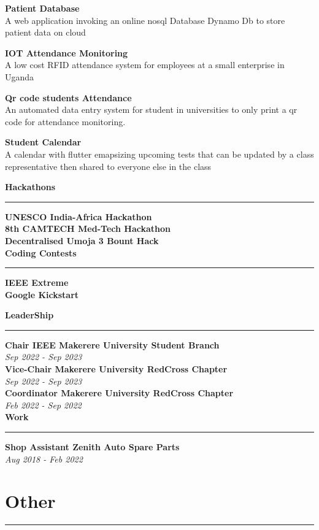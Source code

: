 \documentclass[a4paper]{article}
\begin{document}
\begin{minipage}[t]{0.5\textwidth}
        {\bf Patient Database}\\
        A web application invoking an online nosql Database Dynamo Db to store patient data on cloud

        {\bf IOT Attendance Monitoring}\\
        A low cost RFID attendance system for employees at a small enterprise in Uganda

        {\bf Qr code students Attendance}\\
        An automated data entry system for student in universities to only print a qr code for attendance monitoring.

        {\bf Student Calendar}\\
        A calendar with flutter emapsizing upcoming tests that can be updated by a class representative then shared to everyone else in the class

        {\Large\bf Hackathons}
        \hrule
        {\bf UNESCO India-Africa Hackathon}\\
        {\bf 8th CAMTECH Med-Tech Hackathon}\\
        {\bf Decentralised Umoja 3 Bount Hack}\\
        {\Large\bf Coding Contests}
        \hrule
        {\bf IEEE Extreme}\\
        {\bf Google Kickstart}\\

    \end{minipage}
    \hfil
    \begin{minipage}[t]{0.5\textwidth}
        {\Large\bf LeaderShip}
        \hrule
        {\bf Chair IEEE Makerere University Student Branch}\\
        \hfil{\em Sep 2022 - Sep 2023}\\
        {\bf Vice-Chair Makerere University RedCross Chapter}\\
        \hfil{\em Sep 2022 - Sep 2023}\\
        {\bf Coordinator Makerere University RedCross Chapter}\\
        \hfil{\em Feb 2022 - Sep 2022}\\

        {\Large\bf Work}
        \hrule
        {\bf Shop Assistant Zenith Auto Spare Parts}\\
        \hfil{\em Aug 2018 - Feb 2022}\\

        \section*{Other}
        \hrule

    \end{minipage}
\end{document}
